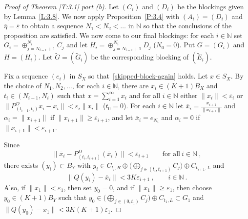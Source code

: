 \documentclass[11pt,leqno]{amsart}
\theoremstyle{definition}
\newcommand{\N}{\mathbb{N}}
\newcommand{\vp}{\varepsilon}
\newcommand{\xb}{\overline{x}}
\newcommand{\norm}[1]{\lVert#1\rVert}
\newcommand{\vpb}{\overline\varepsilon}
\newcommand{\etab}{\overline\eta}
\newcommand{\Et}{\tilde E}
\newcommand{\Gt}{\tilde G}
\begin{document}
\begin{proof}[Proof of Theorem \ref{T:3.1} part (b)]
  Let $(C_i)$ and $(D_i)$ be the blockings given by
  Lemma~\ref{L:3.8}. We now apply Proposition~\ref{P:3.4} with
  $(A_i)=(D_i)$ and $\etab=\vpb$ to obtain a sequence $N_1<N_2<\dots$
  in $\N$ so that the conclusions of the proposition are satisfied. We
  now come to our final blockings: for each $i\in\N$ set $G_i=\oplus
  _{j=N_{i-1}+1}^{N_i} C_j$ and let $H_i=\oplus _{j=N_{i-1}+1}^{N_i}
  D_j$ ($N_0=0$). Put $G=(G_i)$ and $H=(H_i)$. Let $\Gt=(\Gt_i)$ be
  the corresponding blocking of $(\Et_i)$.

  Fix a sequence $(e_i)$ in $S_X$ so that~\eqref{skipped-block-again}
  holds.
  Let $x\in S_X$. By the choice of $N_1, N_2, \dots$, for each
  $i\in\N$,  there are $x_i\in (K+1)B_X$ and $t_i\in(N_{i-1},N_i)$
  such that $x=\sum_{i=1}^\infty x_i$ and for all $i\in\N$ either
  $\|x_i\| <\vp_i$ or $\|P^D_{(t_{i-1},t_i)} x_i - x_i\| < \vp_i
  \|x_i\|$ ($t_0=0$). For each $i\in\N$ let
  $\xb_i=\frac{x_{i+1}}{\norm{x_{i+1}}}$ and $\alpha_i=\norm{x_{i+1}}$
  if $\norm{x_{i+1}}\geq \vp_{i+1}$, and let $\xb_i=e_{N_i}$ and
  $\alpha_i=0$ if $\norm{x_{i+1}}<\vp_{i+1}$.

  Since
  \begin{equation}
    \label{E:3.11}
    \norm{\xb_i-P^D_{(t_i,t_{i+1})}(\xb_i)}<\vp_{i+1}\qquad\text{for
      all}\ i\in\N\ ,
  \end{equation}
  there exists $(y_i)\subset B_Y$ with $y_i\in C_{t_i,R}\oplus
  \Big(\bigoplus_{j\in (t_i,t_{i+1})} C_j\Big)\oplus C_{t_{i+1},L}$
  and
  \begin{equation}
    \label{E:3.12}
    \norm{Q(y_i) -\xb_i}< 3K\vp_{i+1}\ ,\qquad i\in\N\ .
  \end{equation}
  Also, if
  $\norm{x_1}<\vp_1$, then set $y_0=0$, and if $\norm{x_1}\geq \vp_1$,
  then choose $y_0\in (K+1)B_Y$ such that $y_0\in \Big(\bigoplus_{j\in
  (0,t_1)} C_j\Big)\oplus C_{t_1,L}\subset G_1$ and $\norm{Q(y_0)
    -x_1}< 3K(K+1)\vp_1$.


\end{proof}
\end{document}
